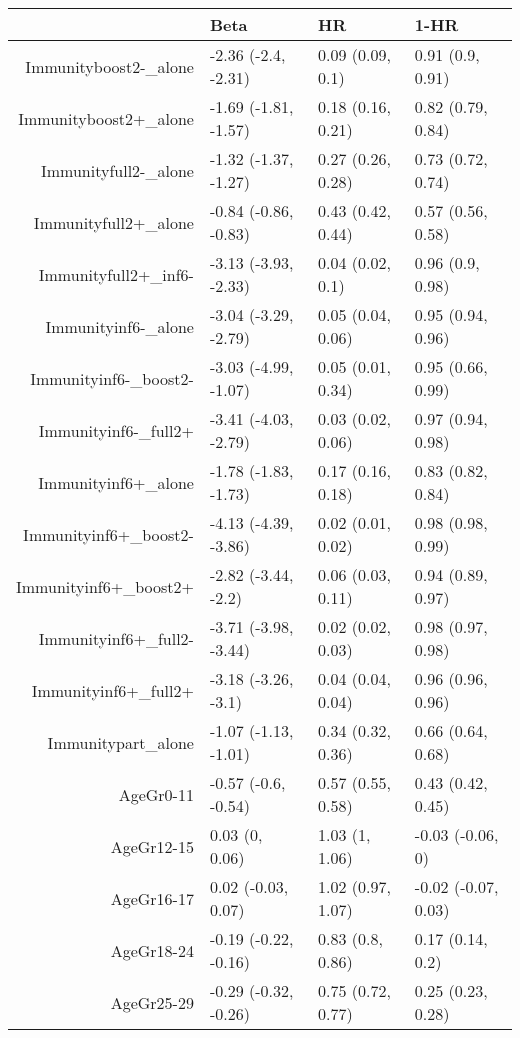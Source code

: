 \begin{table}[ht]
\centering
\begin{tabular}{rlll}
  \hline
 & Beta & HR & 1-HR \\ 
  \hline
Immunityboost2-\_alone & -2.36 (-2.4, -2.31) & 0.09 (0.09, 0.1) & 0.91 (0.9, 0.91) \\ 
  Immunityboost2+\_alone & -1.69 (-1.81, -1.57) & 0.18 (0.16, 0.21) & 0.82 (0.79, 0.84) \\ 
  Immunityfull2-\_alone & -1.32 (-1.37, -1.27) & 0.27 (0.26, 0.28) & 0.73 (0.72, 0.74) \\ 
  Immunityfull2+\_alone & -0.84 (-0.86, -0.83) & 0.43 (0.42, 0.44) & 0.57 (0.56, 0.58) \\ 
  Immunityfull2+\_inf6- & -3.13 (-3.93, -2.33) & 0.04 (0.02, 0.1) & 0.96 (0.9, 0.98) \\ 
  Immunityinf6-\_alone & -3.04 (-3.29, -2.79) & 0.05 (0.04, 0.06) & 0.95 (0.94, 0.96) \\ 
  Immunityinf6-\_boost2- & -3.03 (-4.99, -1.07) & 0.05 (0.01, 0.34) & 0.95 (0.66, 0.99) \\ 
  Immunityinf6-\_full2+ & -3.41 (-4.03, -2.79) & 0.03 (0.02, 0.06) & 0.97 (0.94, 0.98) \\ 
  Immunityinf6+\_alone & -1.78 (-1.83, -1.73) & 0.17 (0.16, 0.18) & 0.83 (0.82, 0.84) \\ 
  Immunityinf6+\_boost2- & -4.13 (-4.39, -3.86) & 0.02 (0.01, 0.02) & 0.98 (0.98, 0.99) \\ 
  Immunityinf6+\_boost2+ & -2.82 (-3.44, -2.2) & 0.06 (0.03, 0.11) & 0.94 (0.89, 0.97) \\ 
  Immunityinf6+\_full2- & -3.71 (-3.98, -3.44) & 0.02 (0.02, 0.03) & 0.98 (0.97, 0.98) \\ 
  Immunityinf6+\_full2+ & -3.18 (-3.26, -3.1) & 0.04 (0.04, 0.04) & 0.96 (0.96, 0.96) \\ 
  Immunitypart\_alone & -1.07 (-1.13, -1.01) & 0.34 (0.32, 0.36) & 0.66 (0.64, 0.68) \\ 
  AgeGr0-11 & -0.57 (-0.6, -0.54) & 0.57 (0.55, 0.58) & 0.43 (0.42, 0.45) \\ 
  AgeGr12-15 & 0.03 (0, 0.06) & 1.03 (1, 1.06) & -0.03 (-0.06, 0) \\ 
  AgeGr16-17 & 0.02 (-0.03, 0.07) & 1.02 (0.97, 1.07) & -0.02 (-0.07, 0.03) \\ 
  AgeGr18-24 & -0.19 (-0.22, -0.16) & 0.83 (0.8, 0.86) & 0.17 (0.14, 0.2) \\ 
  AgeGr25-29 & -0.29 (-0.32, -0.26) & 0.75 (0.72, 0.77) & 0.25 (0.23, 0.28) \\ 

\end{tabular}
\end{table}
